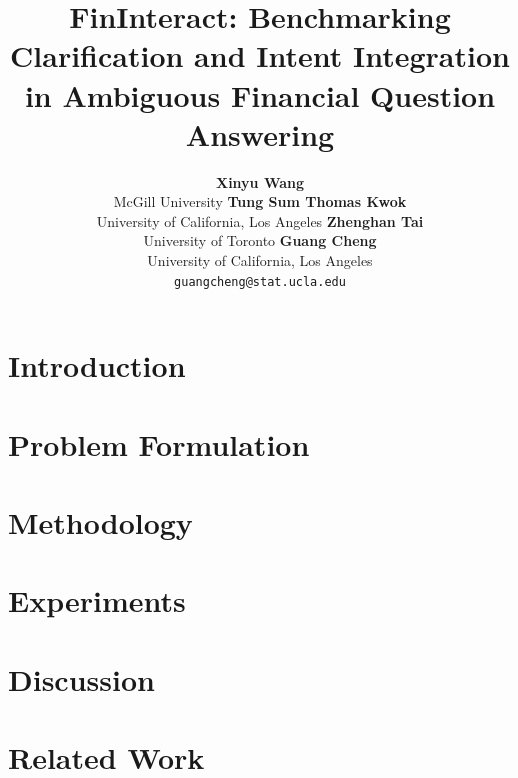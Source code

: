 \documentclass[11pt]{article}
\title{FinInteract: Benchmarking Clarification and Intent Integration in Ambiguous Financial Question Answering}
\author{
  \textbf{Xinyu Wang} \\
  McGill University
  \And
  \textbf{Tung Sum Thomas Kwok} \\
  University of California, Los Angeles
  \And
  \textbf{Zhenghan Tai} \\
  University of Toronto
  \AND
  \textbf{Guang Cheng} \\
  University of California, Los Angeles \\
  \texttt{guangcheng@stat.ucla.edu}
}
\begin{document}
\maketitle

\begin{abstract}

\end{abstract}

\section{Introduction}
\label{sec:intro}


\section{Problem Formulation}
\label{sec:task}


\section{Methodology}
\label{sec:methodology}


\section{Experiments}
\label{sec:exp}
\label{sec:eval}


\section{Discussion}
\label{sec:discussion}


\section{Related Work}
\label{sec:related}

\end{document}
